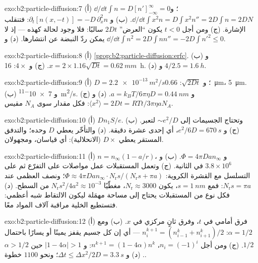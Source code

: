 \begin{solution}{exo:b2:particle-diffusion:7}
(أ) $\dd/\dd t\int n = D[n']_{-\infty}^{\infty} = 0$؛ و $\dd/\dd t\int x^2 n = D\int
x^2 n'' = 2D\int n = 2DN$. (ب) و $\partial_t[n(x,-t)] = -D\,\partial_x^2 n$: فتنقلب
الإشارة. (ج) ومن أجل $t < 0$ يكون ``العرض'' $2Dt$ سالبًا: فلا وجود لحالة
كهذه --- إذ لا يمكن ردّ النبضة عن انتشارها. (د) و $\dd/\dd t\int n^2 = 2D\int nn''
= -2D\int n'^2 \le 0$.
\end{solution}

\begin{solution}{exo:b2:particle-diffusion:8}
(أ) \cref{prop:b2:particle-diffusion:erfc}. (ب) و $x = 2 \times 1.16\sqrt{Dt}
= \qty{0.62}{mm}$. (ج) و $4\times$: \qty{16}{h}. (د) و $4/2.5 = \qty{1.6}{h}$.
\end{solution}

\begin{solution}{exo:b2:particle-diffusion:9}
(أ) $D = \qty{2.2e-13}{m^2/s}$؛ و $\sqrt{2Dt}$: \qty{0.66}{\micro m}،
\qty{5}{\micro m}. (ب) و \qty{7e-11}{m^2/s}. (ج) و $a = k_BT/6\pi\eta D =
\qty{0.44}{nm}$. (د) و $\langle x^2\rangle = 2Dt = RTt/3\pi\eta a N_A$: فكل
مقدار سوى $N_A$ مقيس.
\end{solution}

\begin{solution}{exo:b2:particle-diffusion:10}
(أ) $Dn_1S/e$. (ب) وتحتاج الجسيمات إلى $\sim e^2/D$ لتعبر. (ج)
و $e^2/6D = \qty{670}{s}$، أي إحدى عشرة دقيقة. (د) والتأخّر يعطي $D$ وحده؛
والتدفق المستقر يعطي $D \times$ (الانحلالية): أي قياسان،
ومجهولان.
\end{solution}

\begin{solution}{exo:b2:particle-diffusion:11}
(أ) $n = n_\infty(1 - a/r)$، و $\Phi = 4\pi D a n_\infty$. (ب) و $3.8 \times
10^6$ في الثانية. (ج) وتعمل المستقبلات عمل مواصلات على التفرّع ثم
على التسلسل مع القشرة الكروية: $\Phi \approx 4\pi Dan_\infty
\cdot N_{\text{r}}s/(N_{\text{r}}s + \pi a)$؛ ونصف العظمى عند
$N_{\text{r}}s = \pi a$: فمع $s = \qty{1}{nm}$، يكون $N_{\text{r}} \approx
3000$، مغطّيًا $N_{\text{r}}s^2/4a^2 \approx 10^{-3}$ من السطح.
(د) فكل نوع من المستقبلات يحتاج إلى مساحة مهمَلة ليكون الالتقاط
شبه أعظمي: فتستطيع الخلية مراقبة آلاف المواد معًا.
\end{solution}

\begin{solution}{exo:b2:particle-diffusion:12}
(أ) فرق أمامي في $t$، وفرق ثانٍ مركزي في $x$. (ب) ومع
$\alpha = 1/2$: $n_i^{k+1} = (n_{i-1}^k + n_{i+1}^k)/2$ --- أي إن كل جسيم يقفز
يمينًا أو يسارًا باحتمال $1/2$. (ج) ومن أجل $n_i = (-1)^i$، $n^{k+1} =
(1 - 4\alpha)n^k$: و $|1 - 4\alpha| > 1$ حين $\alpha > 1/2$. (د) و $\Delta t \le
\Delta x^2/2D = \qty{3.3}{s}$؛ ونحو $1100$ خطوة.
\end{solution}

